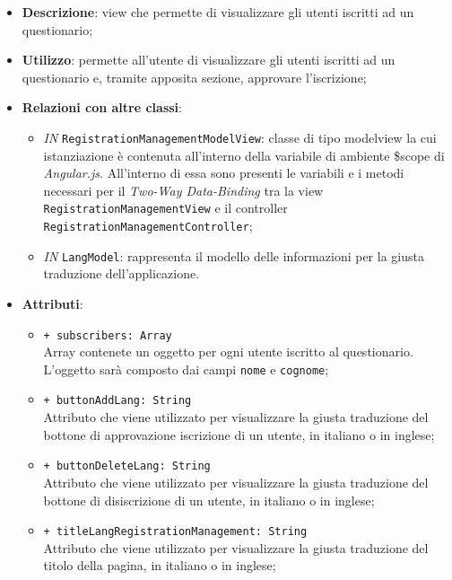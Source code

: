 \begin{itemize}
	\item \textbf{Descrizione}: view che permette di visualizzare gli utenti iscritti ad un questionario;
	\item \textbf{Utilizzo}: permette all'utente di visualizzare gli utenti iscritti ad un questionario e, tramite apposita sezione, approvare l'iscrizione;
	\item \textbf{Relazioni con altre classi}:
	\begin{itemize}
		\item \textit{IN} \texttt{RegistrationManagementModelView}: classe di tipo modelview la cui istanziazione è contenuta all'interno della variabile di ambiente \$scope di \textit{Angular.js}. All'interno di essa sono presenti le variabili e i metodi necessari per il \textit{Two-Way Data-Binding} tra la view \texttt{RegistrationManagementView} e il controller \texttt{RegistrationManagementController};
		\item \textit{IN} \texttt{LangModel}: rappresenta il modello delle informazioni per la giusta traduzione dell'applicazione.
	\end{itemize}
	\item \textbf{Attributi}:
	\begin{itemize}
		\item \texttt{+ subscribers: Array} \\ Array contenete un oggetto per ogni utente iscritto al questionario. L'oggetto sarà composto dai campi \texttt{nome} e \texttt{cognome};
		\item \texttt{+ buttonAddLang: String} \\ Attributo che viene utilizzato per visualizzare la giusta traduzione del bottone di approvazione iscrizione di un utente, in italiano o in inglese;
		\item \texttt{+ buttonDeleteLang: String} \\ Attributo che viene utilizzato per visualizzare la giusta traduzione del bottone di disiscrizione di un utente, in italiano o in inglese;
		\item \texttt{+ titleLangRegistrationManagement: String} \\ Attributo che viene utilizzato per visualizzare la giusta traduzione del titolo della pagina, in italiano o in inglese;		
	\end{itemize}
\end{itemize}